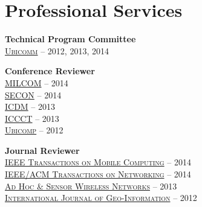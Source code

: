 \section{\sc Professional Services}
{\bf Technical Program Committee}\\
{\href{http://www.iaria.org/conferences.html}{\textsc{Ubicomm}}} -- 2012, 2013, 2014

{\bf Conference Reviewer}\\
{\href{http://www.milcom.org/2014/}{\textsc{MILCOM}}} -- 2014\\
{\href{http://secon2014.ieee-secon.org}{\textsc{SECON}}} -- 2014\\
{\href{http://icdm2013.rutgers.edu}{\textsc{ICDM}}} -- 2013\\
{\href{http://www.mnnit.ac.in/iccct2013}{\textsc{ICCCT}}} -- 2013\\
{\href{http://www.ubicomp.org/ubicomp2012}{\textsc{Ubicomp}}} -- 2012

{\bf Journal Reviewer}\\
{\href{http://www.computer.org/portal/web/tmc}{\textsc{IEEE Transactions on Mobile Computing}}} -- 2014\\
{\href{http://www.ifp.illinois.edu/ton}{\textsc{IEEE/ACM Transactions on Networking}}} -- 2014\\
{\href{http://www.oldcitypublishing.com/AHSWN/AHSWN.html}{\textsc{Ad Hoc \& Sensor Wireless Networks}}} -- 2013\\
{\href{http://www.mdpi.com/journal/ijgi}{\textsc{International Journal of Geo-Information}}} -- 2012
